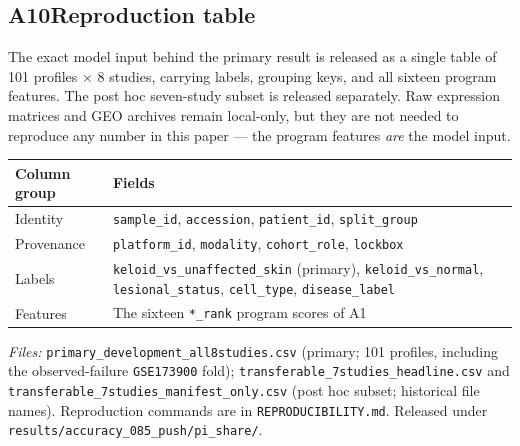 \subsection*{A10\quad Reproduction table}
\label{app:repro}

The exact model input behind the primary result is released as a single
table of 101 profiles $\times$ 8 studies, carrying labels, grouping keys, and
all sixteen program features. The post hoc seven-study subset is released
separately. Raw expression matrices and GEO archives remain
local-only, but they are not needed to reproduce any number in this paper ---
the program features \emph{are} the model input.

{\small
\begin{tabular}{@{}lp{8.8cm}@{}}
\toprule
Column group & Fields \\
\midrule
Identity & \texttt{sample\_id}, \texttt{accession}, \texttt{patient\_id}, \texttt{split\_group} \\
Provenance & \texttt{platform\_id}, \texttt{modality}, \texttt{cohort\_role}, \texttt{lockbox} \\
Labels & \texttt{keloid\_vs\_unaffected\_skin} (primary), \texttt{keloid\_vs\_normal}, \texttt{lesional\_status}, \texttt{cell\_type}, \texttt{disease\_label} \\
Features & The sixteen \texttt{*\_rank} program scores of A1 \\
\bottomrule
\end{tabular}
}

\medskip
\noindent\textit{Files:}
\texttt{primary\_development\_all8studies.csv} (primary; 101 profiles,
including the observed-failure \texttt{GSE173900} fold);
\texttt{transferable\_7studies\_headline.csv} and
\texttt{transferable\_7studies\_manifest\_only.csv} (post hoc subset; historical
file names). Reproduction commands are in \texttt{REPRODUCIBILITY.md}. Released under
\texttt{results/accuracy\_085\_push/pi\_share/}.


